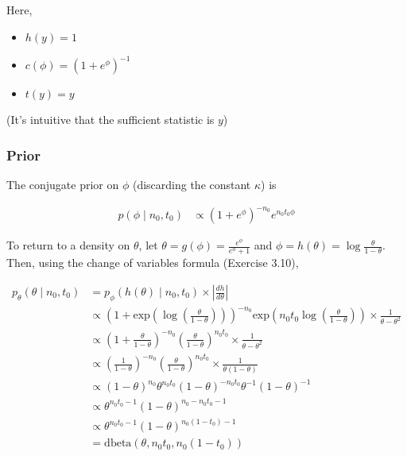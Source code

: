 \documentclass[]{article}
\providecommand{\tightlist}{%
  \setlength{\itemsep}{0pt}\setlength{\parskip}{0pt}}
\begin{document}
Here,

\begin{itemize}
\tightlist
\item
  \(h(y) = 1\)
\item
  \(c(\phi) = (1 + e^\phi)^{-1}\)
\item
  \(t(y) = y\)
\end{itemize}

(It's intuitive that the sufficient statistic is \(y\))

\hypertarget{prior}{%
\subsubsection{Prior}\label{prior}}

The conjugate prior on \(\phi\) (discarding the constant \(\kappa\)) is

\begin{align}
p(\phi \mid n_0, t_0) &\propto (1 + e^{\phi})^{-n_0} e^{n_0 t_0 \phi}
\end{align}

To return to a density on \(\theta\), let
\(\theta = g(\phi) = \frac{e^\phi}{e^\phi + 1}\) and
\(\phi = h(\theta) = \log \frac{\theta}{1 - \theta}\). Then, using the
change of variables formula (Exercise 3.10),

\begin{align}
p_{\theta}(\theta \mid n_0, t_0) &= p_{\phi}(h(\theta) \mid n_0, t_0) \times \left| \frac{dh}{d\theta} \right| \\
&\propto \left(1 + \text{exp}\left(\log \left(\frac{\theta}{1 - \theta}\right)\right)\right)^{-n_0} \text{exp}\left(n_0 t_0 \log \left(\frac{\theta}{1 - \theta}\right) \right) \times \frac{1}{\theta - \theta^2} \\
&\propto \left(1 + \frac{\theta}{1 - \theta} \right)^{-n_0} \left(\frac{\theta}{1 - \theta}\right)^{n_0 t_0} \times \frac{1}{\theta - \theta^2} \\
&\propto \left(\frac{1}{1 - \theta} \right)^{-n_0} \left(\frac{\theta}{1 - \theta}\right)^{n_0 t_0} \times \frac{1}{\theta (1 - \theta)} \\
&\propto (1 - \theta)^{n_0} \theta^{n_0 t_0} (1 - \theta)^{-n_0 t_0} \theta^{-1} (1 - \theta)^{-1} \\
&\propto \theta^{n_0 t_0 - 1} (1 - \theta)^{n_0 - n_0t_0 - 1} \\
&\propto \theta^{n_0 t_0 - 1} (1 - \theta)^{n_0 (1 - t_0) - 1} \\
&= \text{dbeta}(\theta, n_0 t_0, n_0 (1 - t_0))
\end{align}
\end{document}
